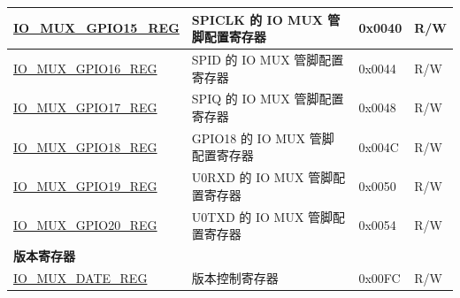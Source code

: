 \begin{longtable}{ | p{6cm} | p{7.2cm} | p{1.3cm} | p{1cm} | }
\hyperref[regdesc:IOMUXGPIONREG]{IO\_MUX\_GPIO15\_REG} & SPICLK 的 IO MUX 管脚配置寄存器 & 0x0040 & R/W \\ \hline
\hyperref[regdesc:IOMUXGPIONREG]{IO\_MUX\_GPIO16\_REG} & SPID 的 IO MUX 管脚配置寄存器 & 0x0044 & R/W \\ \hline
\hyperref[regdesc:IOMUXGPIONREG]{IO\_MUX\_GPIO17\_REG} & SPIQ 的 IO MUX 管脚配置寄存器 & 0x0048 & R/W \\ \hline
\hyperref[regdesc:IOMUXGPIONREG]{IO\_MUX\_GPIO18\_REG} & GPIO18 的 IO MUX 管脚配置寄存器 & 0x004C & R/W \\ \hline
\hyperref[regdesc:IOMUXGPIONREG]{IO\_MUX\_GPIO19\_REG} & U0RXD 的 IO MUX 管脚配置寄存器 & 0x0050 & R/W \\ \hline
\hyperref[regdesc:IOMUXGPIONREG]{IO\_MUX\_GPIO20\_REG} & U0TXD 的 IO MUX 管脚配置寄存器 & 0x0054 & R/W \\ \hline
\multicolumn{4}{|l|}{\textbf{版本寄存器}} \\ \hline
\hyperref[regdesc:IOMUXDATEREG]{IO\_MUX\_DATE\_REG} & 版本控制寄存器 & 0x00FC & R/W \\ \hline
\end{longtable}
